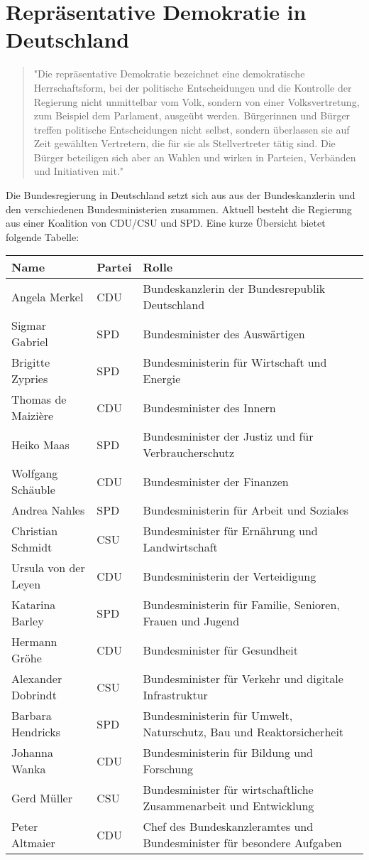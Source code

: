 \section{Repräsentative Demokratie in Deutschland}
\begin{quote}
"Die repräsentative Demokratie bezeichnet eine demokratische Herrschaftsform, bei der politische Entscheidungen und die Kontrolle der Regierung nicht unmittelbar vom Volk, sondern von einer Volksvertretung, zum Beispiel dem Parlament, ausgeübt werden.
Bürgerinnen und Bürger treffen politische Entscheidungen nicht selbst, sondern überlassen sie auf Zeit gewählten Vertretern, die für sie als Stellvertreter tätig sind. Die Bürger beteiligen sich aber an Wahlen und wirken in Parteien, Verbänden und Initiativen mit."
\end{quote}
\cite{bundesregierung}
Die Bundesregierung in Deutschland setzt sich aus aus der Bundeskanzlerin und den verschiedenen Bundesministerien zusammen. Aktuell besteht die Regierung aus einer Koalition von CDU/CSU und SPD. Eine kurze Übersicht bietet folgende Tabelle: \\
\begin{tabular}{lll}
\hline
Name & Partei & Rolle \\
\hline
Angela Merkel & CDU & Bundeskanzlerin der Bundesrepublik Deutschland \\
Sigmar Gabriel & SPD & Bundesminister des Auswärtigen \\
Brigitte Zypries & SPD & Bundesministerin für Wirtschaft und Energie \\
Thomas de Maizière & CDU & Bundesminister des Innern \\
Heiko Maas & SPD & Bundesminister der Justiz und für Verbraucherschutz \\
Wolfgang Schäuble & CDU & Bundesminister der Finanzen \\
Andrea Nahles & SPD & Bundesministerin für Arbeit und Soziales \\
Christian Schmidt & CSU & Bundesminister für Ernährung und Landwirtschaft \\
Ursula von der Leyen & CDU & Bundesministerin der Verteidigung \\
Katarina Barley  & SPD & Bundesministerin für Familie, Senioren, Frauen und Jugend \\
Hermann Gröhe & CDU & Bundesminister für Gesundheit \\
Alexander Dobrindt & CSU & Bundesminister für Verkehr und digitale Infrastruktur \\
Barbara Hendricks & SPD & Bundesministerin für Umwelt, Naturschutz, Bau und Reaktorsicherheit \\
Johanna Wanka & CDU & Bundesministerin für Bildung und Forschung \\
Gerd Müller & CSU & Bundesminister für wirtschaftliche Zusammenarbeit und Entwicklung \\
Peter Altmaier & CDU & Chef des Bundeskanzleramtes und Bundesminister für besondere Aufgaben \\
\hline
\end{tabular} \\
